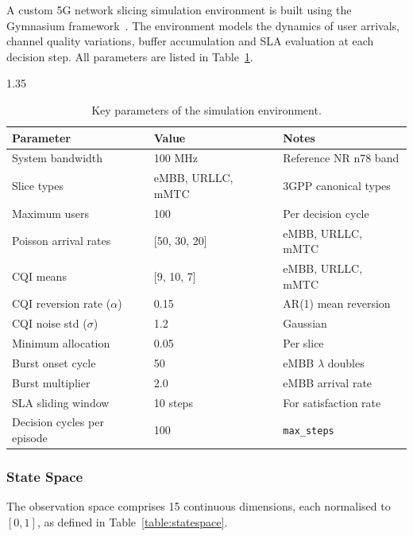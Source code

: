 A custom 5G network slicing simulation environment is built using the Gymnasium framework~\cite{brockman2016gym}. The environment models the dynamics of user arrivals, channel quality variations, buffer accumulation and SLA evaluation at each decision step. All parameters are listed in Table~\ref{table:envparams}.

\begin{table}[h]
  \centering
  \begin{spacing}{1.35}
  \caption{Key parameters of the simulation environment.}\vspace{0.7em}
  \label{table:envparams}
    \begin{tabular}{|p{4.5cm}|p{5cm}|p{4cm}|}
    \hline
    \textbf{Parameter} & \textbf{Value} & \textbf{Notes} \\
    \hline
    System bandwidth & 100 MHz & Reference NR n78 band \\
    \hline
    Slice types & eMBB, URLLC, mMTC & 3GPP canonical types \\
    \hline
    Maximum users & 100 & Per decision cycle \\
    \hline
    Poisson arrival rates & [50, 30, 20] & eMBB, URLLC, mMTC \\
    \hline
    CQI means & [9, 10, 7] & eMBB, URLLC, mMTC \\
    \hline
    CQI reversion rate ($\alpha$) & 0.15 & AR(1) mean reversion \\
    \hline
    CQI noise std ($\sigma$) & 1.2 & Gaussian \\
    \hline
    Minimum allocation & 0.05 & Per slice \\
    \hline
    Burst onset cycle & 50 & eMBB $\lambda$ doubles \\
    \hline
    Burst multiplier & 2.0 & eMBB arrival rate \\
    \hline
    SLA sliding window & 10 steps & For satisfaction rate \\
    \hline
    Decision cycles per episode & 100 & \texttt{max\_steps} \\
    \hline
    \end{tabular}
  \end{spacing}
\end{table}

\subsubsection{State Space}

The observation space comprises 15 continuous dimensions, each normalised to $[0,1]$, as defined in Table~\ref{table:statespace}.

